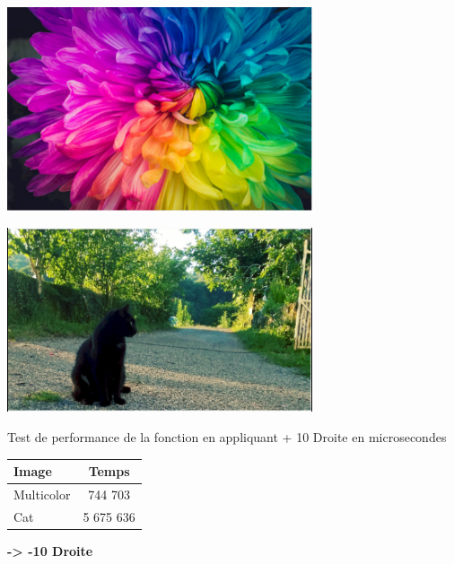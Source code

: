 \documentclass{article}
\begin{document}
\begin{center} 
    \includegraphics[width=9cm]{../Image_fonctions/Multicolor/Selected+10R.PNG}
\end{center}
\begin{center} 
    \includegraphics[width=9cm]{../Image_fonctions/Cat/Selected+10R.PNG}
\end{center}

\begin{center}
\medbreak
Test de performance de la fonction en appliquant + 10 Droite en microsecondes
\bigbreak
   \begin{tabular}{ | l | c | }
     \hline
     Image & Temps \\
     \hline
     Multicolor & 744 703 \\
     \hline
     Cat & 5 675 636 \\
     \hline
   \end{tabular}
 \end{center}

\bigbreak

\textbf{-> -10 Droite}
\end{document}
